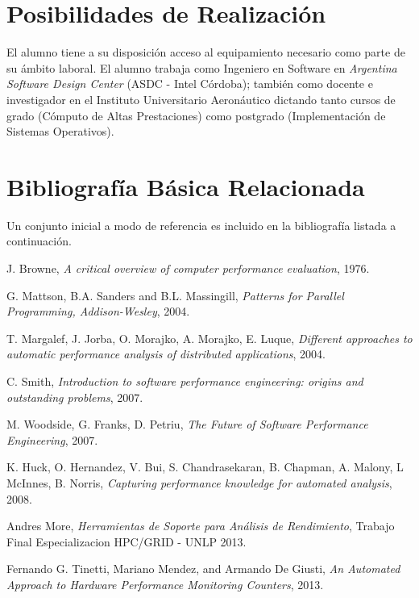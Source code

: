 \documentclass[a4paper]{article}
\begin{document}
\section{Posibilidades de Realización}

El alumno tiene a su disposición acceso al equipamiento necesario como parte de su ámbito laboral.
El alumno trabaja como Ingeniero en Software en {\it Argentina Software Design Center} (ASDC - Intel Córdoba); también
como docente e investigador en el Instituto Universitario Aeronáutico dictando tanto cursos de grado (Cómputo de Altas Prestaciones) como postgrado (Implementación de Sistemas Operativos).

\section{Bibliografía Básica Relacionada}

Un conjunto inicial a modo de referencia es incluido en la bibliografía listada a continuación.

\begin{thebibliography}{9}
  
 J. Browne,
 \emph{A critical overview of computer performance evaluation},
 1976.

 G. Mattson, B.A. Sanders and B.L. Massingill, 
 \emph{Patterns for Parallel Programming, Addison-Wesley},
 2004.

 T. Margalef, J. Jorba, O. Morajko, A. Morajko, E. Luque,
 \emph{Different approaches to automatic performance analysis of distributed applications},
 2004.

 C. Smith,
 \emph{Introduction to software performance engineering: origins and outstanding problems},
 2007.

 M. Woodside, G. Franks, D. Petriu,
 \emph{The Future of Software Performance Engineering},
 2007.

 K. Huck, O. Hernandez, V. Bui, S. Chandrasekaran, B. Chapman, A. Malony, L McInnes, B. Norris,
 \emph{Capturing performance knowledge for automated analysis},
 2008.

  Andres More,
 \emph{Herramientas de Soporte para Análisis de Rendimiento},
 Trabajo Final Especializacion HPC/GRID - UNLP 2013.

  Fernando G. Tinetti, Mariano Mendez, and Armando De Giusti,
  \emph{An Automated Approach to Hardware Performance Monitoring Counters},
  2013. 

\end{thebibliography}
\end{document}
